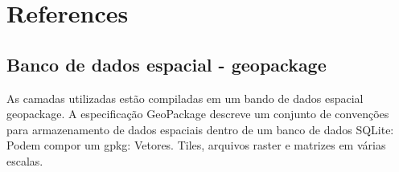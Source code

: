 \documentclass[
  letterpaper,
]{report}
\newlength{\cslhangindent}
\newlength{\cslentryspacingunit} %
\newenvironment{CSLReferences}[2] %
 {%
  \setlength{\parindent}{0pt}
  \ifodd #1
  \let\oldpar\par
  \def\par{\hangindent=\cslhangindent\oldpar}
  \fi
  \setlength{\parskip}{#2\cslentryspacingunit}
 }%
 {}
\begin{document}

\hypertarget{references}{%
\chapter*{References}\label{references}}


\hypertarget{refs}{}
\begin{CSLReferences}{0}{0}
\end{CSLReferences}

\hypertarget{banco-de-dados-espacial---geopackage}{%
\section*{Banco de dados espacial -
geopackage}\label{banco-de-dados-espacial---geopackage}}


As camadas utilizadas estão compiladas em um bando de dados espacial
geopackage. A especificação GeoPackage descreve um conjunto de
convenções para armazenamento de dados espaciais dentro de um banco de
dados SQLite: Podem compor um gpkg: Vetores. Tiles, arquivos raster e
matrizes em várias escalas.
\end{document}
